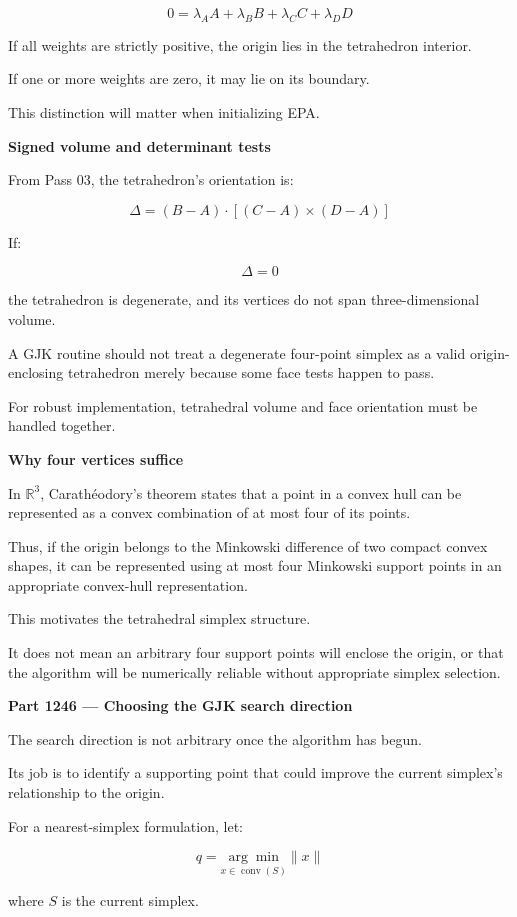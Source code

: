 \[
\boxed{ 0=\lambda_AA+\lambda_BB+\lambda_CC+\lambda_DD }
\]

If all weights are strictly positive, the origin lies in the tetrahedron interior.

If one or more weights are zero, it may lie on its boundary.

This distinction will matter when initializing EPA.

\textbf{Signed volume and determinant tests}

From Pass 03, the tetrahedron's orientation is:

\[
\Delta= (B-A)\cdot[(C-A)\times(D-A)]
\]

If:

\[
\Delta=0
\]

the tetrahedron is degenerate, and its vertices do not span three-dimensional volume.

A GJK routine should not treat a degenerate four-point simplex as a valid origin-enclosing tetrahedron merely because some face tests happen to pass.

For robust implementation, tetrahedral volume and face orientation must be handled together.

\textbf{Why four vertices suffice}

In \(\mathbb R^3\), Carathéodory's theorem states that a point in a convex hull can be represented as a convex combination of at most four of its points.

Thus, if the origin belongs to the Minkowski difference of two compact convex shapes, it can be represented using at most four Minkowski support points in an appropriate convex-hull representation.

This motivates the tetrahedral simplex structure.

It does not mean an arbitrary four support points will enclose the origin, or that the algorithm will be numerically reliable without appropriate simplex selection.

\textbf{Part 1246 --- Choosing the GJK search direction}

The search direction is not arbitrary once the algorithm has begun.

Its job is to identify a supporting point that could improve the current simplex's relationship to the origin.

For a nearest-simplex formulation, let:

\[
q= \underset{x\in\operatorname{conv}(S)}{\arg\min} \|x\|
\]

where \(S\) is the current simplex.

